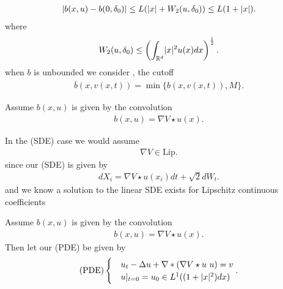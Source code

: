 \begin{align*}
  \lvert b(x,u) - b(0,\delta_0  )\rvert \le  L(\lvert x\rvert + W_2(u,\delta_0 )) \le L(1+\lvert x\rvert)
.\end{align*}
where 
\begin{align*}
  W_2(u,\delta_0) \le  \left(\int_{\mathbb{R}^{d} } \lvert x\rvert^2 u(x) dx\right)^{\frac{1}{2}} 
.\end{align*}
when $b$ is unbounded we consider , the cutoff  
\begin{align*}
  \overline{b}(x,v(x,t))  = \min \{b(x,v(x,t)), M\}  
.\end{align*}
\begin{assumption}\label{b_special}
 Assume $b(x,u) $  is given by the convolution
 \begin{align*}
  b(x,u) = \nabla V \star u(x)
 .\end{align*}
\end{assumption}
\begin{remark}
 In the (SDE)  case we would assume 
\begin{align*}
   \nabla V \in  \text{Lip} \tag{SDE}
 .\end{align*}
 since our (SDE) is given by
 \begin{align*}
  d X_i = \nabla V \star  u(x_i) dt + \sqrt{2} dW_t
 .\end{align*}
 and we know a solution to the linear SDE exists for Lipschitz continuous coefficients 
\end{remark}
\begin{definition}
 Assume $b(x,u) $  is given by the convolution
 \begin{align*}
  b(x,u) = \nabla V \star u(x)
 .\end{align*}
 Then let our (PDE) be given by 
 \begin{align*}
  \text{(PDE)}\begin{cases}
    &u_t - \Delta u + \nabla*(\nabla V \star  u \ u) = v\\
    &u \rvert_{t=0} = u_{0} \in  L^{1}((1+\lvert x\rvert^2)dx) 
  \end{cases}
 .\end{align*}
\end{definition}
